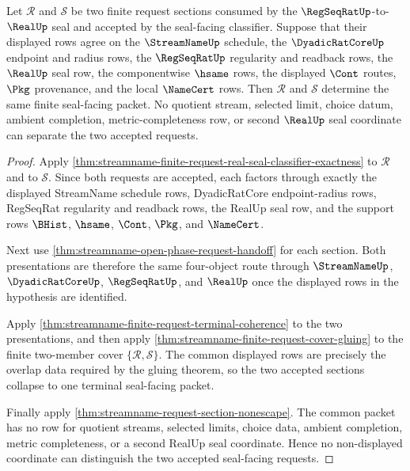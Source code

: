 \begin{theorem}
\label{thm:streamname-finite-request-real-seal-common-refinement-lock}
Let $\mathcal{R}$ and $\mathcal{S}$ be two finite request sections consumed by
the $\RegSeqRatUp$-to-$\RealUp$ seal and accepted by the seal-facing
classifier. Suppose that their displayed rows agree on the $\StreamNameUp$
schedule, the $\DyadicRatCoreUp$ endpoint and radius rows, the $\RegSeqRatUp$
regularity and readback rows, the $\RealUp$ seal row, the componentwise
$\hsame$ rows, the displayed $\Cont$ routes, $\Pkg$ provenance, and the local
$\NameCert$ rows. Then $\mathcal{R}$ and $\mathcal{S}$ determine the same
finite seal-facing packet. No quotient stream, selected limit, choice datum,
ambient completion, metric-completeness row, or second $\RealUp$ seal
coordinate can separate the two accepted requests.
\end{theorem}
\begin{proof}
Apply
\autoref{thm:streamname-finite-request-real-seal-classifier-exactness} to
$\mathcal{R}$ and to $\mathcal{S}$. Since both requests are accepted, each
factors through exactly the displayed StreamName schedule rows, DyadicRatCore
endpoint-radius rows, RegSeqRat regularity and readback rows, the RealUp seal
row, and the support rows $\BHist$, $\hsame$, $\Cont$, $\Pkg$, and
$\NameCert$.

Next use \autoref{thm:streamname-open-phase-request-handoff} for each
section. Both presentations are therefore the same four-object route through
$\StreamNameUp$, $\DyadicRatCoreUp$, $\RegSeqRatUp$, and $\RealUp$ once the
displayed rows in the hypothesis are identified.

Apply \autoref{thm:streamname-finite-request-terminal-coherence} to the two
presentations, and then apply
\autoref{thm:streamname-finite-request-cover-gluing} to the finite two-member
cover $\{\mathcal{R},\mathcal{S}\}$. The common displayed rows are precisely
the overlap data required by the gluing theorem, so the two accepted sections
collapse to one terminal seal-facing packet.

Finally apply \autoref{thm:streamname-request-section-nonescape}. The common
packet has no row for quotient streams, selected limits, choice data, ambient
completion, metric completeness, or a second RealUp seal coordinate. Hence no
non-displayed coordinate can distinguish the two accepted seal-facing
requests.
\end{proof}
